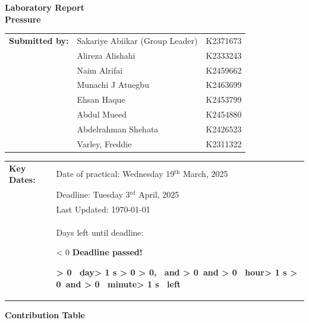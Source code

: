 \documentclass{article}
\newcounter{deadlineyear}\setcounter{deadlineyear}{2025}
\newcounter{deadlinemonth}\setcounter{deadlinemonth}{4}
\newcounter{deadlineday}\setcounter{deadlineday}{3}
\newcounter{mydatenumber}  %
\newcounter{currentdate}   %
\newcounter{daysdiff}      %
\newcounter{currenttime}   %
\newcounter{totalminutes}  %
\newcounter{displaydays}   %
\newcounter{remainingmins} %
\newcounter{displayhours}  %
\newcounter{displaymins}   %
\newcommand{\timeUntilDeadline}{%
	\setmydatenumber{mydatenumber}{\thedeadlineyear}{\thedeadlinemonth}{\thedeadlineday}%
	\setmydatenumber{currentdate}{\the\year}{\the\month}{\the\day}%
	\setcounter{daysdiff}{\themydatenumber - \thecurrentdate}%
	
	\setcounter{currenttime}{\time}%
	
	\setcounter{totalminutes}{\numexpr\thedaysdiff * 1440 - \thecurrenttime}%
	
	\ifnum\thetotalminutes < 0
	\textbf{\color{red}Deadline passed!}%
	\else
	\setcounter{displaydays}{\thetotalminutes / 1440}%
	\setcounter{remainingmins}{\numexpr\thetotalminutes - \thedisplaydays * 1440}%
	\setcounter{displayhours}{\theremainingmins / 60}%
	\setcounter{displaymins}{\numexpr\theremainingmins - \thedisplayhours * 60}%
	
	\textbf{%
		\ifnum\thedisplaydays > 0
		\thedisplaydays\ day\ifnum\thedisplaydays > 1 s\fi%
		\ifnum\thedisplayhours > 0
		\ifnum\thedisplaymins > 0, \else\ and \fi%
		\else
		\ifnum\thedisplaymins > 0\ and \fi%
		\fi%
		\fi%
		\ifnum\thedisplayhours > 0
		\thedisplayhours\ hour\ifnum\thedisplayhours > 1 s\fi%
		\ifnum\thedisplaymins > 0\ and \fi%
		\fi%
		\ifnum\thedisplaymins > 0
		\thedisplaymins\ minute\ifnum\thedisplaymins > 1 s\fi%
		\fi%
		\ left}%
	\fi
}
\begin{document}
	
	\vspace*{\fill}
	\begin{center}
		\textbf{\Huge Laboratory Report}\\[10pt]
		\LARGE \textbf{Pressure}
	\end{center}
	\vspace*{\fill}
	
	\Large    
	\begin{tabular}{@{}l l l@{}}
		\textbf{Submitted by:} & Sakariye Abiikar (Group Leader) & K2371673 \\
		& Alireza Alishahi & K2333243 \\
		& Naim Alrifai & K2459662 \\
		& Munachi J Atuegbu & K2463699 \\
		& Ehsan Haque & K2453799 \\
		& Abdul Mueed & K2454880 \\   
		& Abdelrahman Shehata & K2426523 \\   
		& Varley, Freddie & K2311322
	\end{tabular}
	
	\vspace*{\fill}
	
	\begin{tabular}{@{}l l@{}}
		\textbf{Key Dates:} & Date of practical: Wednesday 19$^{\text{th}}$ March, 2025 \\
		& Deadline: Tuesday 3$^{\text{rd}}$ April, 2025 \\
		& Last Updated: \today\, \currenttime\\
		& Days left until deadline: \timeUntilDeadline \\
	\end{tabular}
	\vspace*{\fill}
	
	\large
	\newpage\noindent	\vspace*{-1em}
	
	\begin{center}
		\LARGE \textbf{Contribution Table}\\[2em]
	\end{center}	
	
\end{document}
